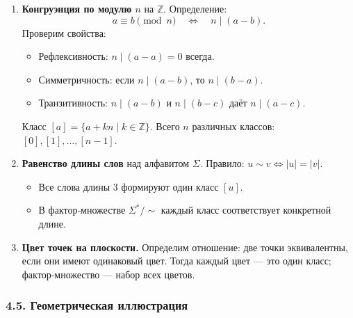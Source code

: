 \begin{enumerate}[label=\arabic*)]
  \item \textbf{Конгруэнция по модулю $n$} на $\mathbb{Z}$.  
    Определение: 
    \[
      a \equiv b \pmod{n}
      \quad\Longleftrightarrow\quad
      n \mid (a-b).
    \]
    Проверим свойства:
    \begin{itemize}[leftmargin=*]
      \item Рефлексивность: $n\mid(a-a)=0$ всегда.
      \item Симметричность: если $n\mid(a-b)$, то $n\mid(b-a)$.
      \item Транзитивность: $n\mid(a-b)$ и $n\mid(b-c)$ даёт $n\mid(a-c)$.
    \end{itemize}
    Класс $[a]=\{a+kn \mid k\in\mathbb{Z}\}$.  
    Всего $n$ различных классов: $[0], [1],\dots,[n-1]$.

  \item \textbf{Равенство длины слов} над алфавитом $\Sigma$.  
    Правило: $u\sim v \iff |u|=|v|$.  
    \begin{itemize}[leftmargin=*]
      \item Все слова длины 3 формируют один класс $[u]$.
      \item В фактор‑множестве $\Sigma^*/{\sim}$ каждый класс соответствует конкретной длине.
    \end{itemize}

  \item \textbf{Цвет точек на плоскости.}  
    Определим отношение: две точки эквивалентны, если они имеют одинаковый цвет.  
    Тогда каждый цвет — это один класс; фактор‑множество — набор всех цветов.
\end{enumerate}

\subsubsection{4.5. Геометрическая иллюстрация}

\begin{center}
\end{center}

